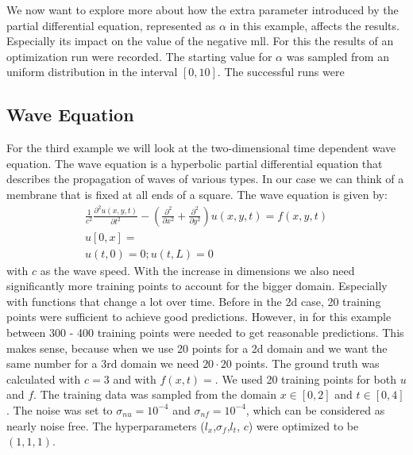 \documentclass{article}
\begin{document}
We now want to explore more about how the extra parameter introduced by the partial differential equation, represented as $\alpha$ in this example, affects the results. Especially its impact on the value of the negative mll. For this the results of an optimization run were recorded. The starting value for $\alpha$ was sampled from an uniform distribution in the interval $\left[0,10\right]$. The successful runs were
\subsection{Wave Equation}
For the third example we will look at the two-dimensional time dependent wave equation. The wave equation is a hyperbolic partial differential equation that describes the propagation of waves of various types. In our case we can think of a membrane that is fixed at all ends of a square. The wave equation is given by:
\begin{equation}
    \begin{aligned}
        \frac{1}{c^2} \frac{\partial^2 u(x,y,t)}{\partial t^2} - (\frac{\partial^2}{\partial x^2} +\frac{\partial^2}{\partial y^2})u(x,y,t) = f(x,y,t) \\ u[0,x] =\\ u(t,0) = 0; u(t,L) = 0
    \end{aligned}
\end{equation}
with $c$ as the wave speed. With the increase in dimensions we also need significantly more training points to account for the bigger domain. Especially with functions that change a lot over time. Before in the 2d case, 20 training points were sufficient to achieve good predictions. However, in for this example between 300 - 400 training points were needed to get reasonable predictions. This makes sense, because when we use 20 points for a 2d domain and we want the same number for a 3rd domain we need $20\cdot 20$ points. 
The ground truth was calculated with $c = 3$ and with $f(x,t) = $.    We used 20 training points for both $u$ and $f$. The training data was sampled from the domain $x \in [0,2]$ and $t \in [0,4]$. The noise was set to $\sigma_{nu} = 10^{-4}$ and $\sigma_{nf} = 10^{-4}$, which can be considered as nearly noise free. The hyperparameters ($l_x$,$\sigma_f$,$l_t$, $c$) were optimized to be $(1,1,1)$. 
\end{document}
